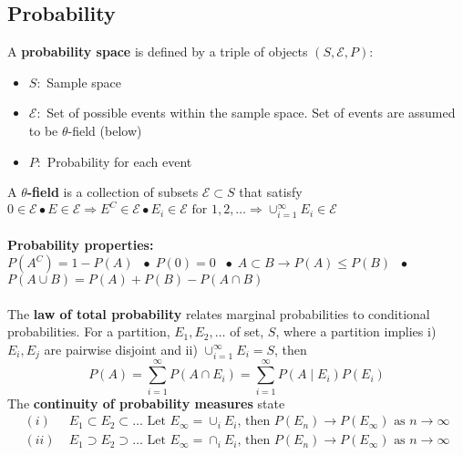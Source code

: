 \documentclass{article}
\newcommand{\bspace}{$\;\bullet\;$}
\begin{document}
\subsection{Probability}
A \textbf{probability space} is defined by a triple of objects $(S, \mathcal{E}, P)$:
\begin{itemize}
    \item $S:$ Sample space
    \item $\mathcal{E}:$ Set of possible events within the sample space. Set of events are assumed to be $\theta$-field (below)
    \item $P:$ Probability for each event
\end{itemize}
A \textbf{$\theta$-field} is a collection of subsets $\mathcal{E} \subset S$ that satisfy $0 \in \mathcal{E} \bullet E \in \mathcal{E} \Rightarrow E^C \in \mathcal{E} \bullet E_i \in \mathcal{E} \textrm{ for } 1, 2, \dots \Rightarrow \cup_{i=1}^\infty E_i \in \mathcal{E}$\\\\
\textbf{Probability properties: }\\
$P(A^C)=1 - P(A)$ \bspace $P(0)=0$ \bspace $A\subset B \longrightarrow P(A) \leq P(B)$ \bspace $P(A \cup B)=P(A)+P(B) - P(A \cap B)$\\\\
The \textbf{law of total probability} relates marginal probabilities to conditional probabilities. For a partition, {$E_1, E_2, \dots$} of set, $S$, where a partition implies i) $E_i, E_j$ are pairwise disjoint and ii) $\cup_{i=1}^\infty E_i = S$, then
\begin{equation*}
     P(A) = \sum_{i=1}^\infty P(A\cap E_i) = \sum_{i=1}^\infty P(A \mid E_i) P(E_i)
\end{equation*}
The \textbf{continuity of probability measures} state
\begin{align*}
    (i) \;& E_1 \subset E_2 \subset \dots \textrm{   Let } E_\infty = \cup_i E_i \textrm{, then } P(E_n) \longrightarrow P(E_\infty) \textrm{ as } n \longrightarrow \infty\\
    (ii) \;& E_1 \supset E_2 \supset \dots \textrm{   Let } E_\infty = \cap_i E_i \textrm{, then } P(E_n) \longrightarrow P(E_\infty) \textrm{ as } n \longrightarrow \infty\\\\
\end{align*}
\end{document}
